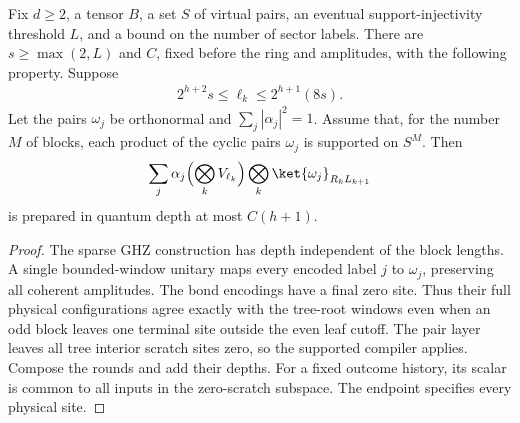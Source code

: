 \begin{lemma}
    \label{thm:ldp_coherent_supported_blocks}
    \leanok
    Fix $d\ge2$, a tensor $B$, a set $S$ of virtual pairs, an eventual
    support-injectivity threshold $L$, and a bound on the number of sector
    labels. There are $s\ge\max(2,L)$ and $C$, fixed before the ring and
    amplitudes, with the following property. Suppose
    \begin{align*}
        2^{h+2}s\le\ell_k\le2^{h+1}(8s).
    \end{align*}
    Let the pairs $\omega_j$ be orthonormal and $\sum_j|\alpha_j|^2=1$.
    Assume that, for the number $M$ of blocks, each product of the
    cyclic pairs $\omega_j$ is supported on $S^M$. Then
    \begin{align*}
        \sum_j\alpha_j\Bigl(\bigotimes_kV_{\ell_k}\Bigr)
        \bigotimes_k\ket{\omega_j}_{R_kL_{k+1}}
    \end{align*}
    is prepared in quantum depth at most $C(h+1)$.
\end{lemma}
\begin{proof}
    \leanok
    The sparse GHZ construction has depth independent of the block lengths.
    A single bounded-window unitary maps every encoded label $j$ to
    $\omega_j$, preserving all coherent amplitudes. The bond encodings have
    a final zero site. Thus their full physical configurations agree exactly
    with the tree-root windows even when an odd block leaves one terminal
    site outside the even leaf cutoff. The pair layer leaves all tree
    interior scratch sites zero, so the supported compiler applies.
    Compose the rounds and add their depths. For a fixed outcome
    history, its scalar is common to all inputs in the zero-scratch
    subspace. The endpoint specifies every physical site.
\end{proof}

